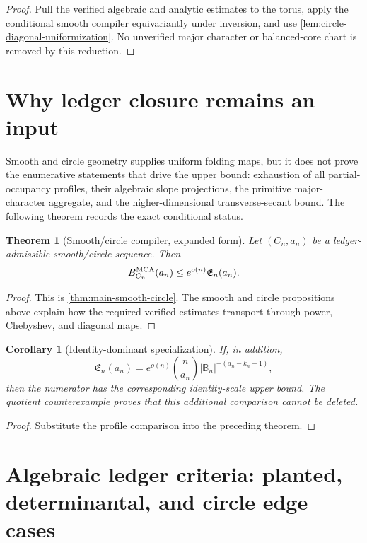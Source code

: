 \documentclass[12pt,a4paper]{amsart}
\numberwithin{equation}{section}
\newtheorem{theorem}{Theorem}[section]
\newtheorem{corollary}[corollary]{Corollary}
\theoremstyle{remark}
\newcommand{\B}{\mathbb B}
\newcommand{\abs}[1]{\lvert #1\rvert}
\begin{document}
\begin{proof}
Pull the verified algebraic and analytic estimates to the torus, apply the
conditional smooth compiler equivariantly under inversion, and use
\cref{lem:circle-diagonal-uniformization}.  No unverified major character
or balanced-core chart is removed by this reduction.
\end{proof}

\section{Why ledger closure remains an input}\label{sec:no-closed-hypothesis}

Smooth and circle geometry supplies uniform folding maps, but it does not
prove the enumerative statements that drive the upper bound: exhaustion of
all partial-occupancy profiles, their algebraic slope projections, the
primitive major-character aggregate, and the higher-dimensional
transverse-secant bound.  The following theorem records the exact
conditional status.

\begin{theorem}[Smooth/circle compiler, expanded form]\label{thm:smooth-circle-ledger-closure-expanded}
Let \((C_n,a_n)\) be a ledger-admissible smooth/circle sequence.  Then
\[
 B_{C_n}^{\rm MCA}(a_n)\le e^{o(n)}\mathfrak E_n(a_n).
\]
\end{theorem}

\begin{proof}
This is \cref{thm:main-smooth-circle}.  The smooth and
circle propositions above explain how the required verified estimates
transport through power, Chebyshev, and diagonal maps.
\end{proof}

\begin{corollary}[Identity-dominant specialization]\label{cor:final-no-ledger-assumption}
If, in addition,
\[
 \mathfrak E_n(a_n)=e^{o(n)}\binom n{a_n}
 \abs{\B_n}^{-(a_n-k_n-1)},
\]
then the numerator has the corresponding
identity-scale upper bound.  The quotient counterexample proves that this
additional comparison cannot be deleted.
\end{corollary}

\begin{proof}
Substitute the profile comparison into the preceding theorem.
\end{proof}


\section{Algebraic ledger criteria: planted, determinantal, and circle edge cases}\label{sec:algebraic-repairs}
\end{document}
